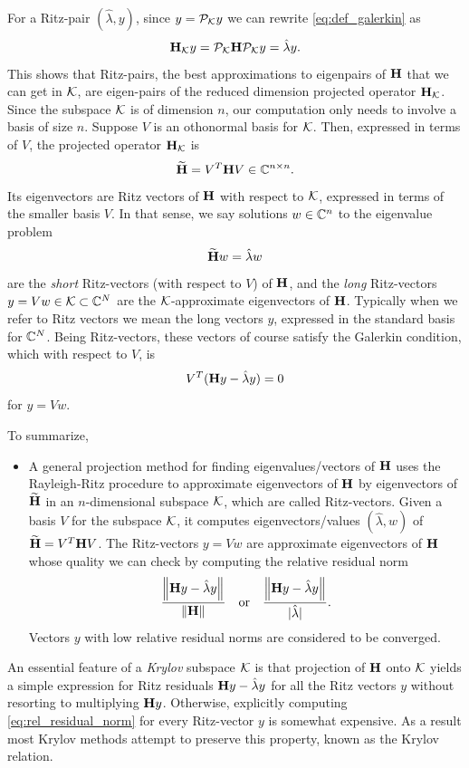  For a Ritz-pair $(\hat{\lambda}, y)$, since $y= \mathcal{P}_{\mathcal{K}} y$ we can rewrite  \eqref{eq:def_galerkin} as 
\[
\textbf{\textup{H}}_{\mathcal{K}} y = \mathcal{P}_{\mathcal{K}} \textbf{\textup{H}} \mathcal{P}_{\mathcal{K}} y = \hat{\lambda} y.
\]
This shows that Ritz-pairs, the best approximations to eigenpairs of $\textbf{\textup{H}}$ that we can get in $\mathcal{K}$, are eigen-pairs of the reduced dimension projected operator $\textbf{\textup{H}}_{\mathcal{K}}$.  Since the subspace $\mathcal{K}$ is of dimension $n$, our computation only needs to involve a basis of size $n$.  Suppose $V$ is an othonormal basis for $\mathcal{K}$.  Then, expressed in terms of $V$, the projected operator $\textbf{\textup{H}}_{\mathcal{K}}$ is
\[
\widetilde{\textbf{\textup{H}}} = V^T \textbf{\textup{H}} V \in \mathbb{C}^{n\times n}.
\]
 Its eigenvectors are Ritz vectors of $\textbf{\textup{H}}$ with respect to $\mathcal{K}$, expressed in terms of the smaller basis $V$.    In that sense, we say solutions $w\in\mathbb{C}^n$ to the eigenvalue problem 
\[
\widetilde{\textbf{\textup{H}}} w = \hat{\lambda} w 
\]
are the \emph{short} Ritz-vectors (with respect to $V$) of $\textbf{\textup{H}}$, and the \emph{long} Ritz-vectors $y=V w \in\mathcal{K} \subset \mathbb{C}^N$ are the $\mathcal{K}$-approximate eigenvectors of $\textbf{\textup{H}}$.  Typically when we refer to Ritz vectors we mean the long vectors $y$, expressed in the standard basis for $\mathbb{C}^N$. Being Ritz-vectors, these vectors of course satisfy the Galerkin condition, which with respect to $V$, is 
\[
V^T(\textbf{\textup{H}} y - \hat{\lambda} y) = 0
\]
for $y= V w$.

\medskip
To summarize, 
\begin{itemize}
\item A general projection method for finding eigenvalues/vectors of $\textbf{\textup{H}}$ uses the Rayleigh-Ritz procedure to approximate eigenvectors of $\textbf{\textup{H}}$ by eigenvectors of $\widetilde{\textbf{\textup{H}}}$ in an $n$-dimensional subspace $\mathcal{K}$, which are called Ritz-vectors.  Given a basis $V$ for the subspace $\mathcal{K}$, it computes eigenvectors/values $(\hat{\lambda},w)$ of $\widetilde{\textbf{\textup{H}}} = V^T\textbf{\textup{H}} V$.  The Ritz-vectors $y=V w$ are approximate eigenvectors of $\textbf{\textup{H}}$ whose quality we can check by computing the relative residual norm
\begin{equation}
\frac{\left\| \textbf{\textup{H}} y - \hat{\lambda} y \right\|_{}}{\left\| \textbf{\textup{H}} \right\|_{}} \quad \text{or}\quad
 \frac{\left\| \textbf{\textup{H}} y - \hat{\lambda} y \right\|_{}}{| \hat{\lambda} | }.
\label{eq:rel_residual_norm}
\end{equation}
Vectors $y$ with low relative residual norms are considered to be converged.
\end{itemize}


An essential feature of a \emph{Krylov} subspace $\mathcal{K}$ is that projection of $\textbf{\textup{H}}$ onto $\mathcal{K}$ yields a simple expression for Ritz residuals $\textbf{\textup{H}} y - \hat{\lambda} y$ for all the Ritz vectors $y$ without resorting to multiplying $\textbf{\textup{H}} y$.  Otherwise, explicitly computing \eqref{eq:rel_residual_norm} for every Ritz-vector $y$ is somewhat expensive. As a result most Krylov methods attempt to preserve this property, known as the Krylov relation.    


